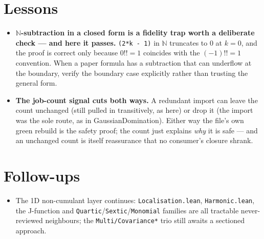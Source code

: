 \documentclass[11pt]{article}
\begin{document}
\section{Lessons}
\begin{itemize}[noitemsep]
  \item \textbf{$\mathbb N$-subtraction in a closed form is a fidelity trap worth a deliberate check --- and
    here it passes.} \texttt{(2*k - 1)} in $\mathbb N$ truncates to $0$ at $k=0$, and the proof is correct only
    because $0!!=1$ coincides with the $(-1)!!=1$ convention. When a paper formula has a subtraction that can
    underflow at the boundary, verify the boundary case explicitly rather than trusting the general form.
  \item \textbf{The job-count signal cuts both ways.} A redundant import can leave the count unchanged (still
    pulled in transitively, as here) or drop it (the import was the sole route, as in GaussianDomination).
    Either way the file's own green rebuild is the safety proof; the count just explains \emph{why} it is safe
    --- and an unchanged count is itself reassurance that no consumer's closure shrank.
\end{itemize}

\section{Follow-ups}
\begin{itemize}[noitemsep]
  \item The 1D non-cumulant layer continues: \texttt{Localisation.lean}, \texttt{Harmonic.lean}, the
    J-function and \texttt{Quartic}/\texttt{Sextic}/\texttt{Monomial} families are all tractable
    never-reviewed neighbours; the \texttt{Multi/Covariance*} trio still awaits a sectioned approach.
\end{itemize}
\end{document}
